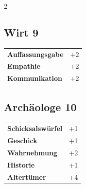 \begin{multicols}{2}
\begin{tcolorbox}

\end{tcolorbox}

\begin{tcolorbox}
    \subsection*{Wirt \hfill \small{9 }}
    \tcblower




\begin{tabular}{@{}ll@{}}
    \textbf{Auffassungsgabe} & +2\\
    \textbf{Empathie} & +2\\
    \textbf{Kommunikation} & +2\\
\end{tabular}


\end{tcolorbox}

\begin{tcolorbox}
    \subsection*{Archäologe \hfill \small{10 }}
    \tcblower




\begin{tabular}{@{}ll@{}}
    \textbf{Schicksalswürfel} & +1\\
    \textbf{Geschick} & +1\\
    \textbf{Wahrnehmung} & +2\\
    \textbf{Historie} & +1\\
    \textbf{Altertümer} & +4\\
\end{tabular}


\end{tcolorbox}


\end{multicols}
